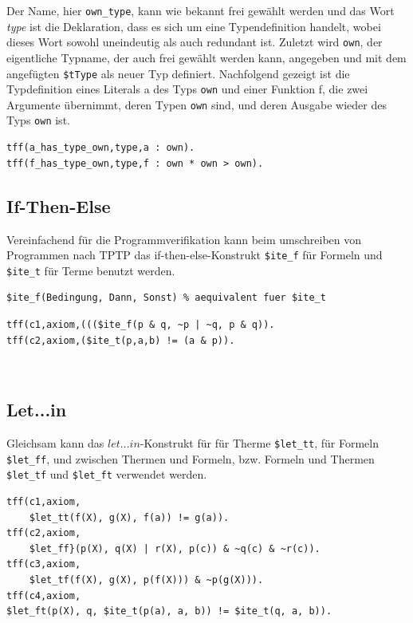 \documentclass{article}
\begin{document}
Der Name, hier \verb|own_type|, kann wie bekannt frei gewählt werden und das Wort \textit{type} ist die Deklaration, dass es sich um eine Typendefinition handelt, wobei dieses Wort sowohl uneindeutig als auch redundant ist.
Zuletzt wird \verb|own|, der eigentliche Typname, der auch frei gewählt werden kann, angegeben und mit dem angefügten \verb|$tType| als neuer Typ definiert.
Nachfolgend gezeigt ist die Typdefinition eines Literals a des Typs \verb|own| und einer Funktion f, die zwei Argumente übernimmt, deren Typen \verb|own| sind, und deren Ausgabe wieder des Typs \verb|own| ist.\\
\begin{lstlisting}[language=tptp]
tff(a_has_type_own,type,a : own).
tff(f_has_type_own,type,f : own * own > own).
\end{lstlisting}

\iffalse %
\subsection{If-Then-Else}
\label{subsec:tptpitef}

Vereinfachend für die Programmverifikation kann beim umschreiben von Programmen nach TPTP das if-then-else-Konstrukt \verb=$ite_f= für Formeln und \verb=$ite_t= für Terme benutzt werden.
\begin{lstlisting}[language=tptp]
$ite_f(Bedingung, Dann, Sonst) % aequivalent fuer $ite_t
\end{lstlisting}
\begin{lstlisting}[language=tptp]
tff(c1,axiom,((($ite_f(p & q, ~p | ~q, p & q)).
tff(c2,axiom,($ite_t(p,a,b) != (a & p)).
\end{lstlisting}
~\cite{hoder2011slides}
\subsection{Let...in}
\label{subsec:tptpletin}

Gleichsam kann das $let\dots in$-Konstrukt für für Therme \verb=$let_tt=, für Formeln \verb=$let_ff=, und zwischen Thermen und Formeln, bzw. Formeln und Thermen \verb=$let_tf= und \verb=$let_ft= verwendet werden.
\begin{lstlisting}[language=tptp]
tff(c1,axiom,
	$let_tt(f(X), g(X), f(a)) != g(a)).
tff(c2,axiom,
	$let_ff}(p(X), q(X) | r(X), p(c)) & ~q(c) & ~r(c)).
tff(c3,axiom,
	$let_tf(f(X), g(X), p(f(X))) & ~p(g(X))).
tff(c4,axiom,
$let_ft(p(X), q, $ite_t(p(a), a, b)) != $ite_t(q, a, b)).
\end{lstlisting}
\end{document}
